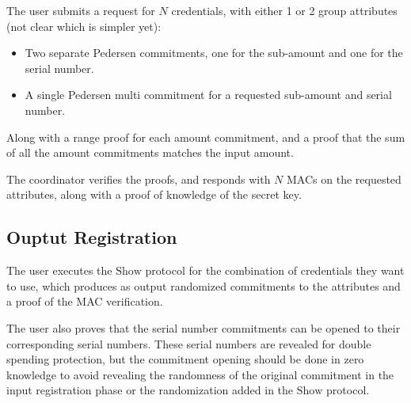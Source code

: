 \documentclass{article}
\begin{document}



The user submits a request for $N$ credentials, with either 1 or 2 group attributes (not clear which is simpler yet):

\begin{itemize}
\item Two separate Pedersen commitments, one for the sub-amount and one for the serial number.
\item A single Pedersen multi commitment for a requested sub-amount and serial number.
\end{itemize}

Along with a range proof for each amount commitment, and a proof that the sum of all the amount commitments matches the input amount.

The coordinator verifies the proofs, and responds with $N$ MACs on the requested attributes, along with a proof of knowledge of the secret key.

\subsection{Ouptut Registration}




The user executes the $\mathrm{Show}$ protocol for the combination of credentials they want to use, which produces as output randomized commitments to the attributes and a proof of the MAC verification.

The user also proves that the serial number commitments can be opened to their corresponding serial numbers. These serial numbers are revealed for double spending protection, but the commitment opening should be done in zero knowledge to avoid revealing the randomness of the original commitment in the input registration phase or the randomization added in the $\mathrm{Show}$ protocol.
\end{document}
